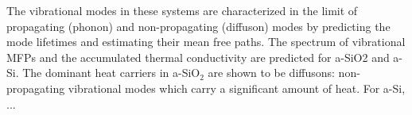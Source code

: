 \documentclass[aps,prb,twocolumn,superscriptaddress,footinbib,amsmath,amssymb,floatfix]{revtex4}
\begin{document}
The vibrational modes in these systems are
characterized in the limit of propagating (phonon) and 
non-propagating (diffuson) modes by predicting the mode lifetimes and 
estimating their mean free paths. 
The spectrum of vibrational MFPs and the accumulated thermal conductivity 
are predicted for a-SiO2 and a-Si. 
The dominant heat carriers in a-SiO$_2$ are shown to be diffusons: 
non-propagating vibrational modes which carry a significant amount 
of heat. For a-Si, ...


\end{document}
